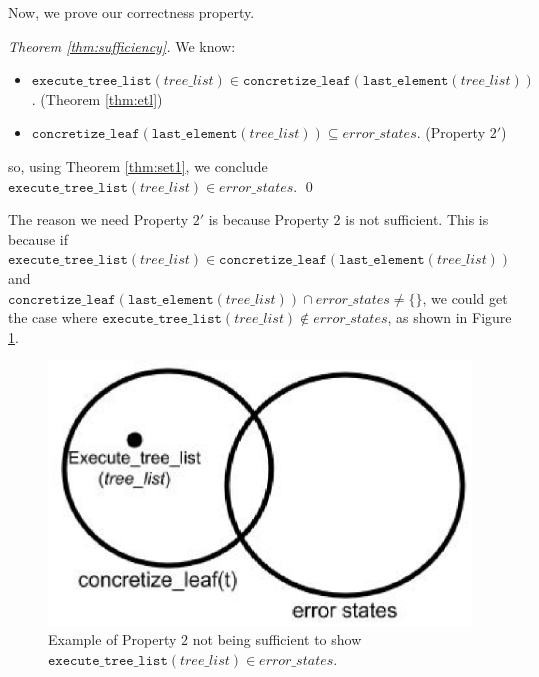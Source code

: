 Now, we prove our correctness property.

\begin{proof}[Theorem \ref{thm:sufficiency}]
We know:
\begin{itemize}
\item $\mathtt{execute\_tree\_list}(tree\_list) \in \mathtt{concretize\_leaf}(\mathtt{last\_element}(tree\_list))$. (Theorem \ref{thm:etl})
\item $\mathtt{concretize\_leaf} (\mathtt{last\_element} (tree\_list)) \subseteq error\_states$. (Property $2'$)
\end{itemize}
so, using Theorem \ref{thm:set1}, we conclude
$\mathtt{execute\_tree\_list} (tree\_list) \in error\_states$. \qed
\end{proof}

The reason we need Property $2'$ is because Property $2$ is not sufficient. 
This is because if $\mathtt{execute\_tree\_list} (tree\_list) \in \mathtt{concretize\_leaf} (\mathtt{last\_element}(tree\_list))$ and \\
$\mathtt{concretize\_leaf} (\mathtt{last\_element} (tree\_list)) \cap error\_states \neq \{\}$, we could get the case where
$\mathtt{execute\_tree\_list} (tree\_list) \notin error\_states$, as shown in Figure \ref{fig:Prop2}.

\begin{figure}
  \centering
\includegraphics[width=.4\textwidth]{prop2.eps}
\caption{Example of Property $2$ not being sufficient to show $\mathtt{execute\_tree\_list} (tree\_list) \in error\_states$.}
\label{fig:Prop2}
\end{figure}




